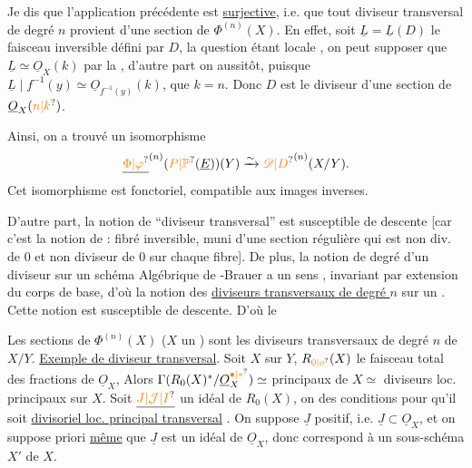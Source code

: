 Je dis que l'application précédente est \uline{surjective}, i.e. que tout diviseur transversal  de degré $n$ provient d'une section de $\Phi^{(n)}(X)$. En effet, soit $\underline{L}=\underline{L}(D)$ le faisceau inversible défini par
$D$,  la question étant locale , on peut supposer que $\underline{L}\simeq\underline{O}_X(k)$ par la , d'autre part on  aussitôt, puisque $\underline{L}\mid f^{-1}(y)\simeq\underline{O}_{f^{-1}(y)}(k)$, que $k=n$. Donc $D$ est le diviseur d'une section de $\underline{O}_X(\unsure{n|k})$.

Ainsi, on a  trouvé un isomorphisme 
\[
\underline{\unsure{\Phi|\varphi}}^{(n)}(\unsure{P|\mathbb{P}}(\underline{E}))(Y)\xrightarrow{\sim}{\unsure{\mathscr{D}|D}}^{(n)}(X/Y).
\]
Cet isomorphisme est fonctoriel, compatible aux images inverses.

D'autre part, la notion de ``diviseur  transversal'' est susceptible de descente [car c'est la notion de : fibré inversible, muni d'une section régulière qui est non div. de $0$ et non diviseur de $0$ sur chaque fibre]. De plus, la notion de degré d'un diviseur sur un schéma Algébrique de -Brauer a un sens , invariant par extension du corps de base, d'où la notion des \uline{diviseurs  transversaux de degré $n$} sur un . Cette notion est susceptible de descente. D'où le

\uline{} Les sections de $\Phi^{(n)}(X)$ ($X$ un ) sont les diviseurs  transversaux de degré $n$ de $X/Y$.
\uline{Exemple de diviseur transversal}. Soit $X$  sur $Y$,  $R_{\unsure{0|o}}(X)$ le faisceau total des fractions de $\underline{O}_X$,  Alors $\Gamma(R_0(X)^*/\underline{O}_X^{\unsure{\bullet|*}})\simeq$      principaux de $X\simeq$ diviseurs loc. principaux sur $X$. Soit $\underline{\unsure{J|\mathcal{J}|I}}$ un idéal de $R_0(X)$, on  des conditions pour qu'il soit  \uline{divisoriel loc. principal transversal} \deleted{$\unsure{\xi}$}. On suppose $\underline{J}$ positif, i.e. $\underline{J}\subset\underline{O}_X$, et on suppose  priori \uline{même} que $\underline{J}$ est un idéal de $\underline{O}_X$, \deleted{$\unsure{\xi}$} donc correspond à un sous-schéma $X'$ de $X$.

